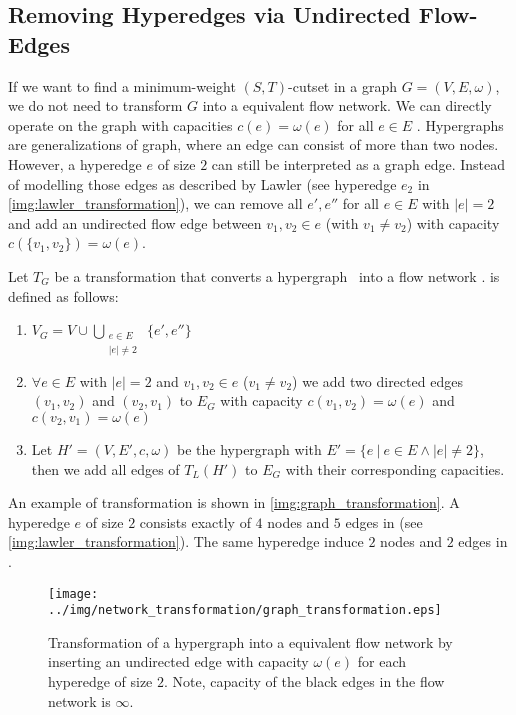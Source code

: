\subsection{Removing Hyperedges via Undirected Flow-Edges}
\label{sec:edge_size_network}

If we want to find a minimum-weight $(S,T)$-cutset in a graph $G = (V,E,\omega)$, we do not need to transform
$G$ into a equivalent flow network. We can directly operate on the graph with capacities
$c(e) = \omega(e)$ for all $e \in E$ \cite{ford1956maximal}. Hypergraphs are generalizations of graph, where
an edge can consist of more than two nodes. However, a hyperedge $e$ of size $2$ can still be 
interpreted as a graph edge. Instead of modelling those edges as described by Lawler \cite{lawler1973}
(see hyperedge $e_2$ in \autoref{img:lawler_transformation}), we can remove all $e',e''$ for all $e \in E$
with $|e| = 2$ and add an undirected flow edge between $v_1,v_2 \in e$ (with $v_1 \neq v_2$) with
capacity $c(\{v_1,v_2\}) = \omega(e)$.

\begin{definition}
Let $T_G$ be a transformation that converts a hypergraph \HypergraphDef~into 
a flow network .  is defined as follows:
\begin{enumerate}
\item $V_G = V \cup \bigcup\limits_{\substack{e \in E \\ |e| \neq 2}}\ \{e', e''\}$
\item $\forall e \in E$ with $|e| = 2$ and $v_1,v_2 \in e$ ($v_1 \neq v_2$) we add 
      two directed edges $(v_1,v_2)$ and $(v_2,v_1)$ to $E_G$ with capacity $c(v_1,v_2) = \omega(e)$
      and $c(v_2,v_1) = \omega(e)$
\item Let $H' = (V,E',c,\omega)$ be the hypergraph with $E' = \{e\ |\ e \in E \land |e| \neq 2\}$,
      then we add all edges of $T_L(H')$ to $E_G$ with their corresponding capacities.
\end{enumerate} 
\end{definition}

An example of transformation  is shown in \autoref{img:graph_transformation}. A hyperedge
$e$ of size $2$ consists exactly of $4$ nodes and $5$ edges in  (see \autoref{img:lawler_transformation}).
The same hyperedge induce $2$ nodes and $2$ edges in . 
 
\begin{figure}
\centering
\texttt{[image: ../img/network\_transformation/graph\_transformation.eps]}
\caption{Transformation of a hypergraph into a equivalent flow network by inserting 
         an undirected edge with capacity $\omega(e)$ for each hyperedge of size $2$. 
         Note, capacity of the black edges in the flow network is $\infty$.}
\label{img:graph_transformation}
\end{figure}

